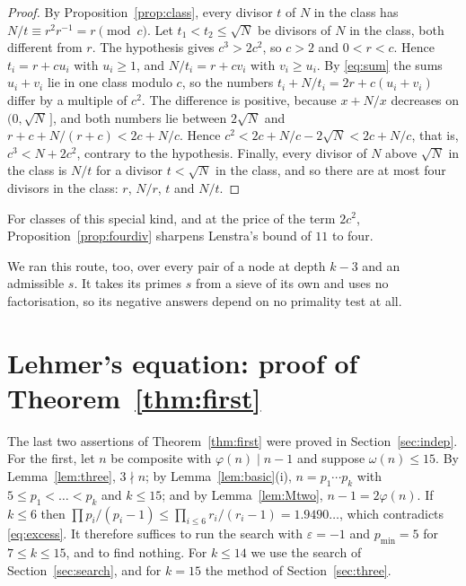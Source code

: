 \documentclass[11pt,reqno]{amsart}
\numberwithin{equation}{section}
\theoremstyle{plain}
\theoremstyle{definition}
\theoremstyle{remark}
\begin{document}
\begin{proof}
By Proposition~\ref{prop:class}, every divisor $t$ of $N$ in the
class has $N/t\equiv r^2r^{-1}=r\pmod c$. Let $t_1<t_2\le\sqrt N$ be
divisors of $N$ in the class, both different from $r$. The hypothesis
gives $c^3>2c^2$, so $c>2$ and $0<r<c$. Hence $t_i=r+cu_i$ with
$u_i\ge1$, and $N/t_i=r+cv_i$ with $v_i\ge u_i$. By \eqref{eq:sum} the sums
$u_i+v_i$ lie in one class modulo $c$, so the numbers
$t_i+N/t_i=2r+c(u_i+v_i)$ differ by a multiple of $c^2$. The difference
is positive, because $x+N/x$ decreases on $(0,\sqrt N\,]$, and both
numbers lie between $2\sqrt N$ and $r+c+N/(r+c)<2c+N/c$. Hence
$c^2<2c+N/c-2\sqrt N<2c+N/c$, that is, $c^3<N+2c^2$, contrary to the
hypothesis. Finally, every divisor of $N$ above $\sqrt N$ in the class
is $N/t$ for a divisor $t<\sqrt N$ in the class, and so there are at
most four divisors in the class: $r$, $N/r$, $t$ and $N/t$.
\end{proof}

For classes of this special kind, and at the price of the term $2c^2$,
Proposition~\ref{prop:fourdiv} sharpens Lenstra's bound of $11$ to
four.

We ran this route, too, over every pair of a node at depth $k-3$ and
an admissible $s$. It takes its primes $s$ from a sieve of its own and
uses no factorisation, so its negative answers depend on no primality
test at all.

\section{Lehmer's equation: proof of Theorem~\ref{thm:first}}\label{sec:first}

The last two assertions of Theorem~\ref{thm:first} were proved in
Section~\ref{sec:indep}. For the first, let $n$ be composite with
$\varphi(n)\mid n-1$ and suppose $\omega(n)\le15$. By
Lemma~\ref{lem:three}, $3\nmid n$; by
Lemma~\ref{lem:basic}(i), $n=p_1\cdots p_k$ with $5\le p_1<\dots<p_k$
and $k\le15$; and by Lemma~\ref{lem:Mtwo}, $n-1=2\varphi(n)$. If
$k\le6$ then $\prod p_i/(p_i-1)\le\prod_{i\le6}r_i/(r_i-1)=1.9490\ldots$,
which contradicts \eqref{eq:excess}. It therefore suffices to run the
search with $\varepsilon=-1$ and $p_{\min}=5$ for $7\le k\le15$, and to
find nothing. For $k\le14$ we use the search of
Section~\ref{sec:search}, and for $k=15$ the method of
Section~\ref{sec:three}.
\end{document}
